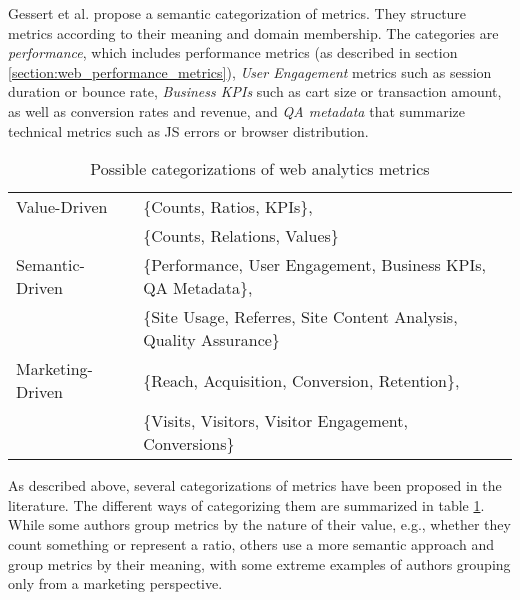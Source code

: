 Gessert et al. propose a semantic categorization of metrics. They structure metrics according to their meaning and domain membership.
The categories are \textit{performance}, which includes performance metrics (as described in section \ref{section:web_performance_metrics}),
\textit{User Engagement} metrics such as session duration or bounce rate,
\textit{Business KPIs} such as cart size or transaction amount, as well as conversion rates and revenue,
and \textit{QA metadata} that summarize technical metrics such as JS errors or browser distribution. %




\begin{table}[h]
	\small
	\centering
	\begin{tabular}{ | l | l | }
	\hline
	Value-Driven
	& \{Counts, Ratios, KPIs\},  \\
	& \{Counts, Relations, Values\} \\
	\hline
	Semantic-Driven
	& \{Performance, User Engagement, Business KPIs, QA Metadata\},  \\
	& \{Site Usage, Referres, Site Content Analysis, Quality Assurance\} \\
	\hline
	Marketing-Driven
	& \{Reach, Acquisition, Conversion, Retention\}, \\
	& \{Visits, Visitors, Visitor Engagement, Conversions\} \\
	\hline
	\end{tabular}
	\medskip
	\caption{Possible categorizations of web analytics metrics}
	\label{table:business_metrics_categorizations}
\end{table}



As described above, several categorizations of metrics have been proposed in the literature.
The different ways of categorizing them are summarized in table \ref{table:business_metrics_categorizations}.
While some authors group metrics by the nature of their value, e.g., whether they count something or represent a ratio, others use a more semantic approach and group metrics by their meaning, with some extreme examples of authors grouping only from a marketing perspective.

